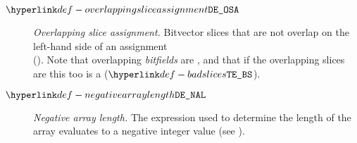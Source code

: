 \begin{description}
\hypertarget{def-overlappingsliceassignment}{}
\item[$\OverlappingSliceAssignment$]
  \textit{Overlapping slice assignment.}
  Bitvector slices that are not \symbolicallyevaluable{} overlap on the left-hand side of an assignment \\
  ().
  Note that overlapping \emph{bitfields} are \typingerrorsterm{},
  and that if the overlapping slices are \symbolicallyevaluable{} this too is a \typingerrorterm{} ($\BadSlices$).

\hypertarget{def-negativearraylength}{}
\item[$\NegativeArrayLength$]
  \textit{Negative array length.}
  The expression used to determine the length of the array evaluates to a negative integer value
  (see ).
\end{description}

